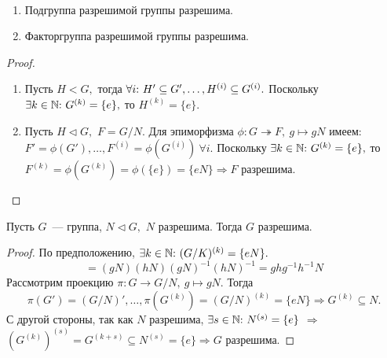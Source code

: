         \begin{lemma}
        \
            \begin{enumerate}
            \setlength\itemsep{0.1em}
                \item Подгруппа разрешимой группы разрешима. 
                \item Факторгруппа разрешимой группы разрешима. 
            \end{enumerate}
        \end{lemma}
        \begin{proof}
        \
            \begin{enumerate}
            \setlength\itemsep{0.1em}
                \item Пусть ${H<G,}$ тогда ${\forall i{:}{ } \  H' \subseteq G', \ldots, H^{(i)} \subseteq G^{(i)}.}$ Поскольку ${\exists k \in \mathbb{N} {:}{ } \  G^{(k)} = \{e\},}$ то ${H^{(k)} = \{e\}.}$
                \item Пусть ${H \lhd G,}$ ${F = G/N.}$ Для эпиморфизма ${\phi : G \twoheadrightarrow F, \ g \mapsto gN}$ имеем: ${F' = \phi(G'), \ldots, F^{(i)} = \phi(G^{(i)}) \ \forall i.}$ Поскольку ${\exists k \in \mathbb{N} {:}{ } \  G^{(k)} = \{e\},}$ то ${F^{(k)} = \phi(G^{(k)}) = \phi(\{e\}) = \{eN\} \Rightarrow F}$ разрешима.
            \end{enumerate}
        \end{proof}
        \begin{statement}
            Пусть $G$~--- группа, ${N \lhd G,}$ $N$ разрешима. Тогда $G$ разрешима.
        \end{statement}
        \begin{proof}
            По предположению, ${\exists k \in \mathbb{N}{:} \ (G/K)^{(k)} = \{eN\}.}$
            \begin{equation*}
                [gN, hN] = (gN)(hN)(gN)^{-1}(hN)^{-1} = ghg^{-1}h^{-1}N
            \end{equation*}
            Рассмотрим проекцию ${\pi : G \rightarrow G/N, \ g \mapsto gN.}$ Тогда
            \begin{equation*}
                \pi(G') = (G/N)', \ldots, \pi(G^{(k)}) = (G/N)^{(k)} = \{eN\} \Rightarrow G^{(k)} \subseteq N.
            \end{equation*}
            С другой стороны, так как $N$ разрешима, ${\exists s \in \naturals{:} \ N^{(s)} = \{e\}}$ $\Rightarrow$ ${{(G^{(k)})}^{(s)} = G^{(k+s)} \subseteq N^{(s)} = \{e\}} \Rightarrow G$ разрешима. \qedhere
        \end{proof}